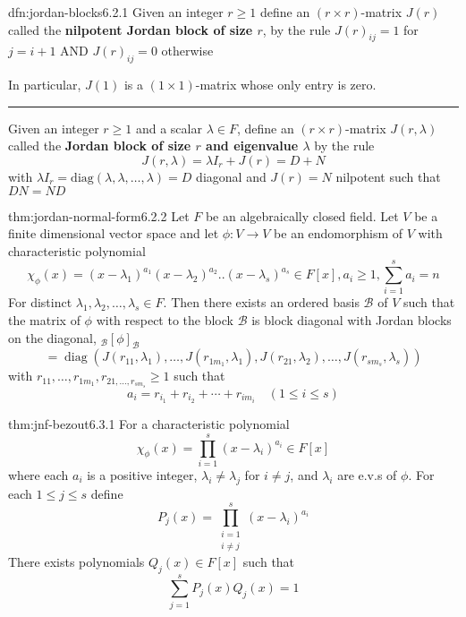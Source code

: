 \documentclass[landscape, 8pt]{extarticle}
\DeclareMathOperator{\diag}{diag}
\begin{document}
\begin{multicols}{3}
\begin{dfn}{dfn:jordan-blocks}{6.2.1}
    Given an integer $r \ge 1$ define an $(r \times r)$-matrix $J(r)$ called the \textbf{nilpotent Jordan block of size $r$}, by the rule $J(r)_{ij} = 1$ for $j = i + 1$ AND $J(r)_{ij} = 0$ otherwise

    In particular, $J(1)$ is a $(1 \times 1)$-matrix whose only entry is zero.

    \noindent\rule{\textwidth}{0.2pt}
    Given an integer $r \ge 1$ and a scalar $\lambda\in F$, define an $(r \times r)$-matrix $J(r, \lambda)$ called the \textbf{Jordan block of size $r$ and eigenvalue $\lambda$} by the rule
    \[J(r, \lambda) = \lambda I_{r} + J(r) = D + N\]
    with $\lambda I_{r} = \text{diag}(\lambda, \lambda,\dots, \lambda) = D$ diagonal and $J(r) = N$ nilpotent such that $DN = ND$
\end{dfn}

\newpage

\begin{thm}{thm:jordan-normal-form}{6.2.2}
    Let $F$ be an algebraically closed field. Let $V$ be a finite dimensional vector space and let $\phi : V \to V$ be an endomorphism of $V$ with characteristic polynomial
    \[\chi_{\phi}(x) = (x - \lambda_{1})^{a_{1}}(x - \lambda_{2})^{a_{2}} . . (x - \lambda_{s})^{a_{s}}\in F[x], a_{i} \ge 1, \sum_{i = 1}^{s} a_{i} = n\]
    For distinct $\lambda_{1},\lambda_{2},\dots,\lambda_{s}\in F$. Then there exists an ordered basis $\mathcal{B}$ of $V$ such that the matrix of $\phi$ with respect to the block $\mathcal{B}$ is block diagonal with Jordan blocks on the diagonal, ${}_{\mathcal{B}}[\phi]_{\mathcal{B}}$
    \[ = \diag(J(r_{11}, \lambda_{1}),\dots,J(r_{1m_{1}}, \lambda_{1}), J(r_{21}, \lambda_{2}),\dots,J(r_{sm_{s}}, \lambda_{s}))\]
    with $r_{11},\dots,r_{1m_{1}}, r_{21,\dots,r_{sm_{s}}} \ge 1$ such that
    \[a_{i} = r_{i_{1}} + r_{i_{2}} + \cdots + r_{im_{i}} \quad (1 \le i \le s)\]
\end{thm}

\begin{thm}{thm:jnf-bezout}{6.3.1}
    For a characteristic polynomial
    \[\chi_{\phi}(x) = \prod_{i = 1}^{s} (x - \lambda_{i})^{a_{i}}\in F[x]\]
    where each $a_{i}$ is a positive integer, $\lambda_{i} \ne \lambda_{j}$ for $i\ne j$, and $\lambda_{i}$ are e.v.s of $\phi$. For each $1\le j \le s$ define
    \[P_{j}(x) = \prod_{\substack{i = 1 \\ i \ne j}}^{s} (x - \lambda_{i})^{a_{i}}\]
    There exists polynomials $Q_{j}(x)\in F[x]$ such that
    \[\sum_{j = 1}^{s} P_{j}(x)Q_{j}(x) = 1\]
\end{thm}


\end{multicols}
\end{document}
